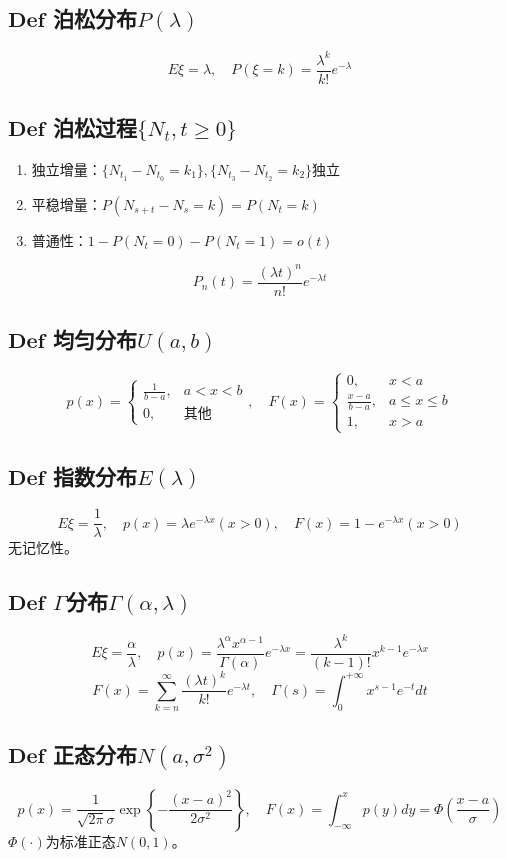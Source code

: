 \documentclass{article}
\begin{document}
	\subsection{$\bm{Def}$ 泊松分布$P(\lambda)$}
	\[
	E\xi=\lambda,\quad P(\xi=k)=\frac{\lambda^k}{k!}e^{-\lambda}
	\]
	\subsection{$\bm{Def}$ 泊松过程$\{N_t,t\ge0\}$}
	\begin{enumerate}
		\item 独立增量：$\{N_{t_1}-N_{t_0}=k_1\},\{N_{t_3}-N_{t_2}=k_2\}$独立
		\item 平稳增量：$P(N_{s+t}-N_s=k)=P(N_t=k)$
		\item 普通性：$1-P(N_t=0)-P(N_t=1)=o(t)$
	\end{enumerate}
	\[
	P_n(t)=\frac{(\lambda t)^n}{n!}e^{-\lambda t}
	\]
	\subsection{$\bm{Def}$ 均匀分布$U(a,b)$}
	\[
	p(x)=
	\begin{cases}
		\displaystyle\frac1{b-a},&a<x<b\\[4pt]
		0,&\text{其他}
	\end{cases},\quad
	F(x)=
	\begin{cases}
		0,&x<a\\[4pt]
		\displaystyle\frac{x-a}{b-a},&a\le x\le b\\[4pt]
		1,&x>a
	\end{cases}
	\]
	\subsection{$\bm{Def}$ 指数分布$E(\lambda)$}
	\[
	E\xi=\frac1\lambda,\quad p(x)=\lambda e^{-\lambda x}(x>0),\quad F(x)=1-e^{-\lambda x}(x>0)
	\]
	无记忆性。
	\subsection{$\bm{Def}$ $\Gamma$分布$\Gamma(\alpha,\lambda)$}
	\[
	E\xi=\frac\alpha\lambda,\quad
	p(x)=\frac{\lambda^\alpha x^{\alpha-1}}{\Gamma(\alpha)}e^{-\lambda x}=\frac{\lambda^k}{(k-1)!}x^{k-1}e^{-\lambda x}
	\]
	\[
	F(x)=\sum_{k=n}^{\infty}\frac{(\lambda t)^k}{k!}e^{-\lambda t},\quad \Gamma(s)=\int_{0}^{+\infty}x^{s-1}e^{-t}dt
	\]
	\subsection{$\bm{Def}$ 正态分布$N(a,\sigma^2)$}
	\[
	p(x)=\frac1{\sqrt{2\pi}\sigma}\exp\left\{-\frac{(x-a)^2}{2\sigma^2}\right\},\quad F(x)=\int_{-\infty}^xp(y)dy=\Phi\left(\frac{x-a}{\sigma}\right)
	\]
	$\Phi(\cdot)$为标准正态$N(0,1)$。
\end{document}

